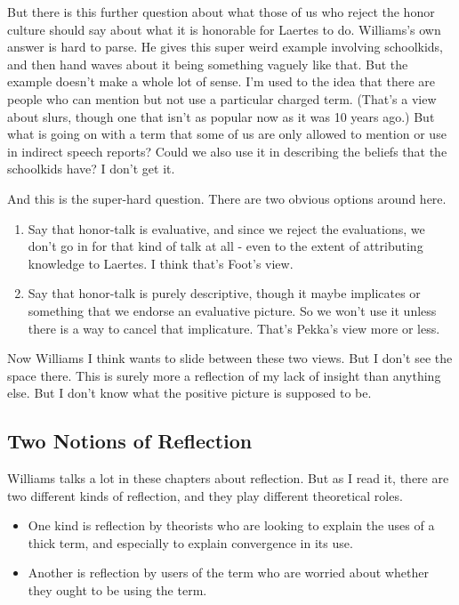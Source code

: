 \documentclass[
]{article}
\providecommand{\tightlist}{%
  \setlength{\itemsep}{0pt}\setlength{\parskip}{0pt}}
\begin{document}
But there is this further question about what those of us who reject the
honor culture should say about what it is honorable for Laertes to do.
Williams's own answer is hard to parse. He gives this super weird
example involving schoolkids, and then hand waves about it being
something vaguely like that. But the example doesn't make a whole lot of
sense. I'm used to the idea that there are people who can mention but
not use a particular charged term. (That's a view about slurs, though
one that isn't as popular now as it was 10 years ago.) But what is going
on with a term that some of us are only allowed to mention or use in
indirect speech reports? Could we also use it in describing the beliefs
that the schoolkids have? I don't get it.

And this is the super-hard question. There are two obvious options
around here.

\begin{enumerate}
\def\labelenumi{\arabic{enumi}.}
\tightlist
\item
  Say that honor-talk is evaluative, and since we reject the
  evaluations, we don't go in for that kind of talk at all - even to the
  extent of attributing knowledge to Laertes. I think that's Foot's
  view.
\item
  Say that honor-talk is purely descriptive, though it maybe implicates
  or something that we endorse an evaluative picture. So we won't use it
  unless there is a way to cancel that implicature. That's Pekka's view
  more or less.
\end{enumerate}

Now Williams I think wants to slide between these two views. But I don't
see the space there. This is surely more a reflection of my lack of
insight than anything else. But I don't know what the positive picture
is supposed to be.

\hypertarget{two-notions-of-reflection}{%
\subsection{Two Notions of Reflection}\label{two-notions-of-reflection}}

Williams talks a lot in these chapters about reflection. But as I read
it, there are two different kinds of reflection, and they play different
theoretical roles.

\begin{itemize}
\tightlist
\item
  One kind is reflection by theorists who are looking to explain the
  uses of a thick term, and especially to explain convergence in its
  use.
\item
  Another is reflection by users of the term who are worried about
  whether they ought to be using the term.
\end{itemize}
\end{document}
